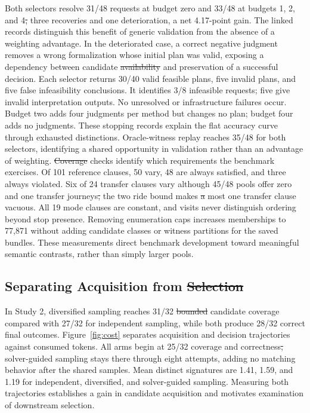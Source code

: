 \documentclass[a4paper,twoside]{article}
\providecommand{\DIFaddtex}[1]{{\protect\color{blue}\uwave{#1}}} %
\providecommand{\DIFdeltex}[1]{{\protect\color{red}\sout{#1}}}                      %
\providecommand{\DIFaddbegin}{} %
\providecommand{\DIFaddend}{} %
\providecommand{\DIFdelbegin}{} %
\providecommand{\DIFdelend}{} %
\providecommand{\DIFadd}[1]{\texorpdfstring{\DIFaddtex{#1}}{#1}} %
\providecommand{\DIFdel}[1]{\texorpdfstring{\DIFdeltex{#1}}{}} %
\begin{document}
Both selectors resolve 31/48 requests at budget zero and 33/48 at budgets 1, 2, and 4\DIFdelbegin \DIFdel{, }\DIFdelend \DIFaddbegin \DIFadd{: }\DIFaddend three recoveries and one deterioration, a net 4.17-point gain. The linked records distinguish this benefit of generic validation from the absence of a weighting advantage. In the deteriorated case, a correct negative judgment removes a wrong formalization whose initial plan was valid, exposing a dependency between candidate \DIFdelbegin \DIFdel{availability }\DIFdelend \DIFaddbegin \DIFadd{coverage }\DIFaddend and preservation of a successful decision.
Each selector returns 30/40 valid feasible plans, five invalid plans, and five false infeasibility conclusions. It identifies 3/8 infeasible requests; five give invalid interpretation outputs. No unresolved or infrastructure failures occur. Budget two adds four judgments per method but changes no plan; budget four adds no judgments. These stopping records explain the flat accuracy curve through exhausted distinctions. Oracle-witness replay reaches 35/48 for both selectors, identifying a shared opportunity in validation rather than an advantage of weighting.
\DIFdelbegin \DIFdel{Coverage }\DIFdelend \DIFaddbegin \DIFadd{Clause }\DIFaddend checks identify which requirements the benchmark exercises. Of 101 reference clauses, 50 vary, 48 are always satisfied, and three always violated. Six of 24 transfer clauses vary although 45/48 pools offer zero and one transfer journeys\DIFdelbegin \DIFdel{, }\DIFdelend \DIFaddbegin \DIFadd{; }\DIFaddend the two ride bound makes \DIFdelbegin \DIFdel{a }\DIFdelend \DIFaddbegin \DIFadd{an at }\DIFaddend most one transfer clause vacuous. All 19 mode clauses are constant, and visits never distinguish ordering beyond stop presence. Removing enumeration caps increases memberships to 77,871 without adding candidate classes or witness partitions for the saved bundles. These measurements direct benchmark development toward meaningful semantic contrasts, rather than simply larger pools.



\subsection{Separating Acquisition from \DIFdelbegin \DIFdel{Selection}\DIFdelend \DIFaddbegin \DIFadd{Final Choice}\DIFaddend }

In Study 2, diversified sampling reaches 31/32 \DIFdelbegin \DIFdel{bounded }\DIFdelend candidate coverage compared with 27/32 for independent sampling, while both produce 28/32 correct final outcomes. Figure~\ref{fig:cost} separates acquisition and decision trajectories against consumed tokens. All arms begin at 25/32 coverage and correctness\DIFdelbegin \DIFdel{, }\DIFdelend \DIFaddbegin \DIFadd{; }\DIFaddend solver-guided sampling stays there through eight attempts, adding no matching behavior after the shared samples. Mean distinct signatures are 1.41, 1.59, and 1.19 for independent, diversified, and solver-guided sampling. Measuring both trajectories establishes a gain in candidate acquisition and motivates examination of downstream selection.
\end{document}
